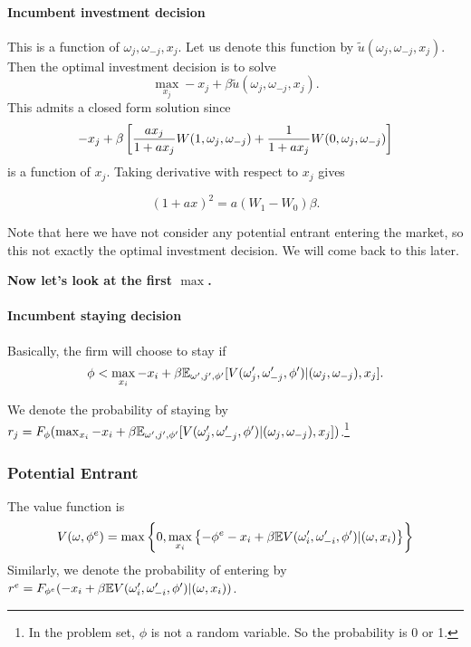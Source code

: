 \documentclass[12pt]{article}[margin=1in]
\begin{document}
\paragraph{Incumbent investment decision}This is a function of $\omega_j, \omega_{-j}, x_j$. Let us denote this function by $\tilde{u}(\omega_j, \omega_{-j}, x_j)$.
Then the optimal investment decision is to solve
$$\max_{x_j} -x_j+\beta \tilde{u}(\omega_j, \omega_{-j}, x_j).$$
This admits a closed form solution since
$$ -x_j + \beta\left[\frac{ax_j}{1+ax_j}W(1, \omega_j,\omega_{-j})+\frac{1}{1+ax_j}W(0, \omega_j,\omega_{-j})\right]$$
is a function of $x_j$.
Taking derivative with respect to $x_j$ gives

$$(1+ax)^2=a(W_1-W_0)\beta.$$

Note that here we have not consider any potential entrant entering the market, so this not exactly the optimal investment decision. We will come back to this later.


\textbf{Now let's look at the first $\max$.}
\paragraph{Incumbent staying decision} Basically, the firm will choose to stay if
$$\phi<\max_{x_i}-x_i+\beta\mathbb{E}_{\omega',j',\phi'}[V(\omega_j',\omega_{-j}',\phi')|(\omega_j, \omega_{-j}),x_j].$$

We denote the probability of staying by $r_j = F_\phi(\max_{x_i}-x_i+\beta\mathbb{E}_{\omega',j',\phi'}[V(\omega_j',\omega_{-j}',\phi')|(\omega_j, \omega_{-j}),x_j])$.\footnote{In the problem set, $\phi$ is not a random variable. So the probability is 0 or 1.}


\subsubsection{Potential Entrant} The value function is
\begin{equation*}
    V(\omega, \phi^e) = \max\left\{0,\max_{x_i}\left\{-\phi^e-x_i+\beta\mathbb{E}{V(\omega_i',\omega_{-i}',\phi')|(\omega, x_i)}\right\}\right\}
\end{equation*}
Similarly, we denote the probability of entering by $r^e=F_{\phi^e}(-x_i+\beta\mathbb{E}{V(\omega_i',\omega_{-i}',\phi')|(\omega, x_i)})$.
\end{document}
